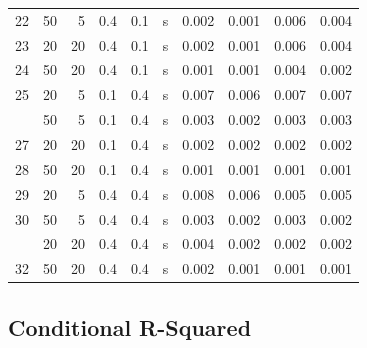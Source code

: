 \documentclass[
  11pt,
]{article}
\begin{document}
\begin{table}[!h]
{\begin{tabular}[t]{rrrrrlrrrr}
22 & 50 & 5 & 0.4 & 0.1 & s & 0.002 & 0.001 & 0.006 & 0.004\\
23 & 20 & 20 & 0.4 & 0.1 & s & 0.002 & 0.001 & 0.006 & 0.004\\
24 & 50 & 20 & 0.4 & 0.1 & s & 0.001 & 0.001 & 0.004 & 0.002\\
25 & 20 & 5 & 0.1 & 0.4 & s & 0.007 & 0.006 & 0.007 & 0.007\\
\addlinespace
26 & 50 & 5 & 0.1 & 0.4 & s & 0.003 & 0.002 & 0.003 & 0.003\\
27 & 20 & 20 & 0.1 & 0.4 & s & 0.002 & 0.002 & 0.002 & 0.002\\
28 & 50 & 20 & 0.1 & 0.4 & s & 0.001 & 0.001 & 0.001 & 0.001\\
29 & 20 & 5 & 0.4 & 0.4 & s & 0.008 & 0.006 & 0.005 & 0.005\\
30 & 50 & 5 & 0.4 & 0.4 & s & 0.003 & 0.002 & 0.003 & 0.002\\
\addlinespace
31 & 20 & 20 & 0.4 & 0.4 & s & 0.004 & 0.002 & 0.002 & 0.002\\
32 & 50 & 20 & 0.4 & 0.4 & s & 0.002 & 0.001 & 0.001 & 0.001\\
\bottomrule
\end{tabular}}
\end{table}

\subsection{Conditional R-Squared}\label{conditional-r-squared}
\end{document}

